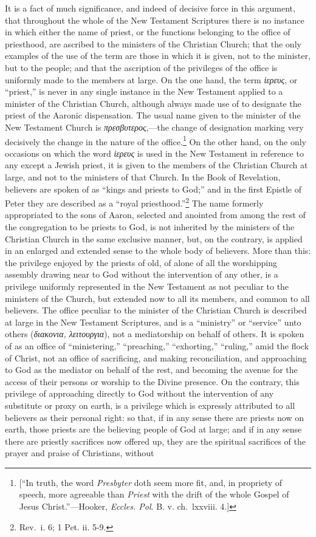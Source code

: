 \documentclass[english,]{book}
\begin{document}
It is a fact of much significance, and indeed of decisive force in this argument, that throughout the whole of the New Testament Scriptures there is no instance in which either the name of priest, or the functions belonging to the office of priesthood, are ascribed to the ministers of the Christian Church; that the only examples of the use of the term are those in which it is given, not to the minister, but to the people; and that the ascription of the privileges of the office is uniformly made to the members at large. On the one hand, the term \emph{ἱερευς}, or ``priest,'' is never in any single instance in the New Testament applied to a minister of the Christian Church, although always made use of to designate the priest of the Aaronic dispensation. The usual name given to the minister of the New Testament Church is \emph{πρεσβυτερος},---the change of designation marking very decisively the change in the nature of the office.\footnote{{[}``In truth, the word \emph{Presbyter} doth seem more fit, and, in propriety of speech, more agreeable than \emph{Priest} with the drift of the whole Gospel of Jesus Christ.''---Hooker, \emph{Eccles. Pol}. B. v. ch.~lxxviii. 4.{]}} On the other hand, on the only occasions on which the word \emph{ἱερευς} is used in the New Testament in reference to any except a Jewish priest, it is given to the members of the Christian Church at large, and not to the ministers of that Church. In the Book of Revelation, believers are spoken of as ``kings and priests to God;'' and in the first Epistle of Peter they are described as a ``royal priesthood.''\footnote{Rev.~i. 6; 1 Pet. ii. 5-9.} The name formerly appropriated to the sons of Aaron, selected and anointed from among the rest of the congregation to be priests to God, is not inherited by the ministers of the Christian Church in the same exclusive manner, but, on the contrary, is applied in an enlarged and extended sense to the whole body of believers. More than this: the privilege enjoyed by the priests of old, of alone of all the worshipping assembly drawing near to God without the intervention of any other, is a privilege uniformly represented in the New Testament as not peculiar to the ministers of the Church, but extended now to all its members, and common to all believers. The office peculiar to the minister of the Christian Church is described at large in the New Testament Scriptures, and is a ``ministry'' or ``service'' unto others (\emph{διακονια, λειτουργια}), not a mediatorship on behalf of others. It is spoken of as an office of ``ministering,'' ``preaching,'' ``exhorting,'' ``ruling,'' amid the flock of Christ, not an office of sacrificing, and making reconciliation, and approaching to God as the mediator on behalf of the rest, and becoming the avenue for the access of their persons or worship to the Divine presence. On the contrary, this privilege of approaching directly to God without the intervention of any substitute or proxy on earth, is a privilege which is expressly attributed to all believers as their personal right: so that, if in any sense there are priests now on earth, those priests are the believing people of God at large; and if in any sense there are priestly sacrifices now offered up, they are the spiritual sacrifices of the prayer and praise of Christians, without 
\end{document}
